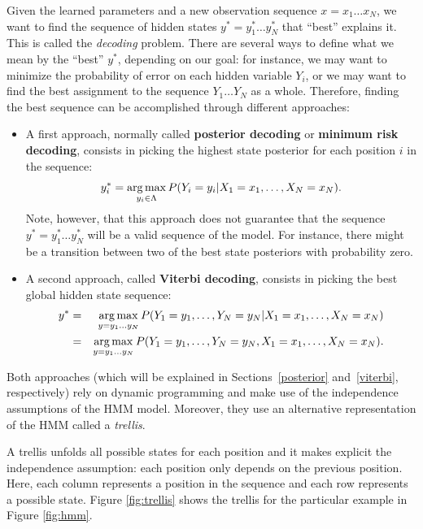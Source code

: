 Given the learned parameters and a new
observation sequence $x = x_1\ldots x_N$, we want to find the sequence of hidden states $y^* = y_1^* \ldots y_N^*$ that ``best'' explains it.
 This is called the \emph{decoding} problem. There are several ways to define what we mean by the ``best''
$y^*$, depending on our goal: for instance, we may want to minimize the probability of error
on each hidden
variable $Y_i$, or we may want to find the best assignment
to the sequence $Y_1\ldots Y_N$ as a whole. 
Therefore, finding the best sequence
can be accomplished through different approaches:

\begin{itemize}
\item A first approach, normally called \textbf{posterior decoding} or \textbf{minimum risk decoding}, consists
in picking the highest state posterior for each position $i$ in the sequence:
\begin{equation}
y_i^* = \operatorname*{arg\,max}_{y_i \in \Lambda} P(Y_i=y_i | X_1=x_1,\ldots,X_N =x_N).
\end{equation}
Note, however, that this approach does not guarantee that the sequence $y^*=y_1^* \ldots y_N^*$ will be a
valid sequence of the model. For instance, there might be a transition
between two of the best state posteriors with probability zero. 

\item A second approach, called \textbf{Viterbi decoding}, consists in
picking the best global hidden state sequence: 
\begin{eqnarray}
y^* &=& \operatorname*{arg\,max}_{y = y_1\ldots y_N} P(Y_1=y_1,\ldots, Y_N=y_N | X_1=x_1,\ldots,X_N =x_N)\nonumber\\
&=& \operatorname*{arg\,max}_{y = y_1\ldots y_N} P(Y_1=y_1,\ldots, Y_N=y_N, X_1=x_1,\ldots,X_N =x_N).
\end{eqnarray}
\end{itemize}

Both approaches (which will be explained in Sections~\ref{posterior} and~\ref{viterbi}, respectively) rely on dynamic programming and make use of the
independence assumptions of the HMM model. Moreover, they use an alternative
representation of the HMM called a \emph{trellis}. 

A trellis unfolds all possible states for each position and it makes explicit the independence assumption: each position only
depends on the previous position. Here, each column represents a position in the sequence and each row represents a possible state. Figure \ref{fig:trellis} shows the
trellis for the particular example in Figure \ref{fig:hmm}. 

